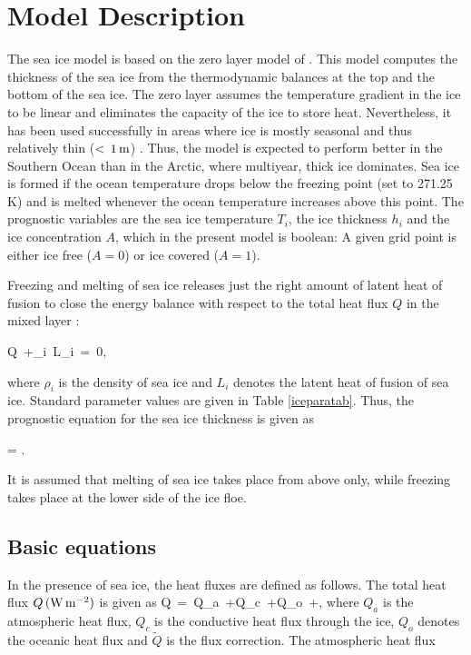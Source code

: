 \chapter{Model Description}
The sea ice model is based on the zero layer model of
 \cite{semtner1976}. This model
 computes the thickness of the sea ice from the thermodynamic
 balances at the top and the bottom of the sea ice.
 The zero layer assumes the temperature gradient in the ice to
 be linear and eliminates the capacity of the ice to store heat.
 Nevertheless, it has been used successfully in areas where ice
 is mostly seasonal and thus relatively thin ($\rm <\, 1\, m$)
 \cite{beckmann2001}.
 Thus, the model is expected to perform better in the Southern
 Ocean than in the Arctic, where multiyear, thick ice dominates. Sea ice is formed if the ocean
 temperature drops below the freezing point
 (set to 271.25 K) and is melted whenever the ocean temperature increases above this point. The prognostic
 variables are the sea ice temperature $T_i$, the ice
 thickness $h_i$ and the ice concentration $A$, which
 in the present model is boolean: A given grid point is either
 ice free ($A=0$) or ice covered ($A=1$). 

Freezing and melting of sea ice releases just the right amount of latent heat 
of fusion to close the energy balance with respect to the total heat flux
$Q$ in the mixed layer \cite{parkinson1979}:

\be
Q\, +\rho_i\, L_i\,  =\, 0,
\label{hieq}
\ee

where $\rho_i$ is the density of sea ice
 and $L_i$ denotes the latent heat
 of fusion of sea ice. Standard parameter values are given in
 Table \ref{iceparatab}. \cite{parkinson1979} Thus, the prognostic
 equation for the sea ice thickness is given as

\be
{\di {} = .}
\label{hi_eq}
\ee

It is assumed that melting of sea ice takes place from above only, while 
freezing takes place at the lower side of the ice floe.


\section*{Basic equations}
In the presence of sea ice, the heat fluxes are defined as follows.
The total heat flux $Q\, \rm (W\, m^{-2})$ is given as
\be
Q \,=\, Q_a\, +Q_c\, +Q_o\, +,
\ee
where $Q_a$ is the atmospheric heat flux,
$Q_c$ is the conductive heat flux through the ice, $Q_o$ denotes the oceanic 
heat
flux and $\tilde{Q}$ is the flux correction. The atmospheric heat flux


